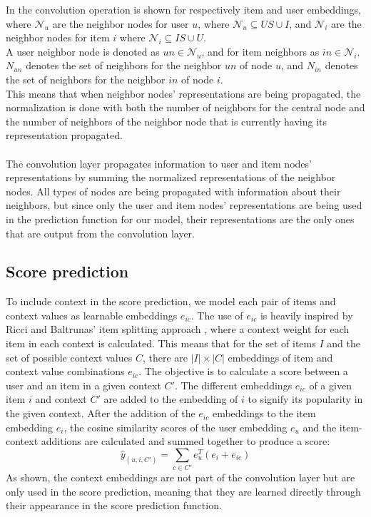 In  the convolution operation is shown for respectively item and user embeddings, where $\mathcal{N}_{u}$ are the neighbor nodes for user $u$, where $\mathcal{N}_{u} \subseteq US \cup I$, and $\mathcal{N}_{i}$ are the neighbor nodes for item $i$ where $\mathcal{N}_{i} \subseteq IS \cup U$.\\
A user neighbor node is denoted as $un \in \mathcal{N}_{u}$, and for item neighbors as $in \in \mathcal{N}_{i}$.
$N_{un}$ denotes the set of neighbors for the neighbor $un$ of node $u$, and $N_{in}$ denotes the set of neighbors for the neighbor $in$ of node $i$.\\
This means that when neighbor nodes' representations are being propagated, the normalization is done with both the number of neighbors for the central node and the number of neighbors of the neighbor node that is currently having its representation propagated.
\\\\
The convolution layer propagates information to user and item nodes' representations by summing the normalized representations of the neighbor nodes.
All types of nodes are being propagated with information about their neighbors, but since only the user and item nodes' representations are being used in the prediction function for our model, their representations are the only ones that are output from the convolution layer.

\subsection{Score prediction}\label{subsec:csgcn_is_score_prediction}
To include context in the score prediction, we model each pair of items and context values as learnable embeddings $e_{ic}$.
The use of $e_{ic}$ is heavily inspired by Ricci and Baltrunas' item splitting approach \cite{baltrunasitemsplitting}, where a context weight for each item in each context is calculated.
This means that for the set of items $I$ and the set of possible context values $C$, there are $|I| \times |C|$ embeddings of item and context value combinations $e_{ic}$.
The objective is to calculate a score between a user and an item in a given context $C'$.
The different embeddings $e_{ic}$ of a given item $i$ and context $C'$ are added to the embedding of $i$ to signify its popularity in the given context.
After the addition of the $e_{ic}$ embeddings to the item embedding $e_i$, the cosine similarity scores of the user embedding $e_u$ and the item-context additions are calculated and summed together to produce a score: 
\begin{equation}\label{eq:is-score-pred}
  \hat{y}_{(u,i,C')} = \sum_{c \in C'} e_u^T(e_i+e_{ic})
\end{equation}
As shown, the context embeddings are not part of the convolution layer but are only used in the score prediction, meaning that they are learned directly through their appearance in the score prediction function.


